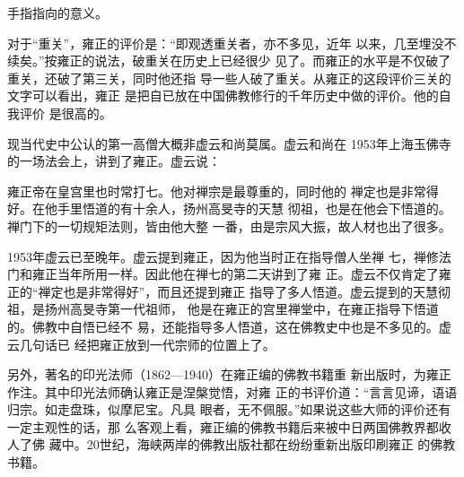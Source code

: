 手指指向的意义。%
\par
对于“重关”，雍正的评价是：“即观透重关者，亦不多见，近年%
以来，几至埋没不续矣。”按雍正的说法，破重关在历史上已经很少%
见了。而雍正的水平是不仅破了重关，还破了第三关，同时他还指%
导一些人破了重关。从雍正的这段评价三关的文字可以看出，雍正%
是把自已放在中国佛教修行的千年历史中做的评价。他的自我评价%
是很高的。%
\par
现当代史中公认的第一高僧大概非虚云和尚莫属。虚云和尚在%
1953年上海玉佛寺的一场法会上，讲到了雍正。虚云说：%
\par
{\bookkai 雍正帝在皇宫里也时常打七。他对禅宗是最尊重的，同时他的}%
{\bookkai 禅定也是非常得好。在他手里悟道的有十余人，扬州高旻寺的天慧}%
{\bookkai 彻祖，也是在他会下悟道的。禅门下的一切规矩法则，皆由他大整}%
{\bookkai 一番，由是宗风大振，故人材也出了很多。}%
\par
1953年虚云已至晚年。虚云提到雍正，因为他当时正在指导僧人坐禅%
七，禅修法门和雍正当年所用一样。因此他在禅七的第二天讲到了雍%
正。虚云不仅肯定了雍正的“禅定也是非常得好”，而且还提到雍正%
指导了多人悟道。虚云提到的天慧彻祖，是扬州高旻寺第一代祖师，%
他是在雍正的宫里禅堂中，在雍正指导下悟道的。佛教中自悟已经不%
易，还能指导多人悟道，这在佛教史中也是不多见的。虚云几句话已%
经把雍正放到一代宗师的位置上了。%
\par
另外，著名的印光法师（1862—1940）在雍正编的佛教书籍重%
新出版时，为雍正作注。其中印光法师确认雍正是涅槃觉悟，对雍%
正的书评价道：“言言见谛，语语归宗。如走盘珠，似摩尼宝。凡具%
眼者，无不佩服。”如果说这些大师的评价还有一定主观性的话，那%
么客观上看，雍正编的佛教书籍后来被中日两国佛教界都收人了佛%
藏中。20世纪，海峡两岸的佛教出版社都在纷纷重新出版印刷雍正%
的佛教书籍。%
